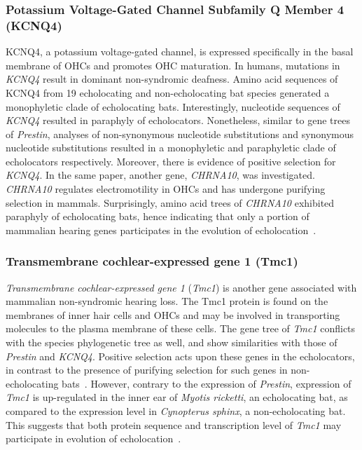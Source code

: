 \documentclass[11pt]{article}
\begin{document}
\subsubsection{Potassium Voltage-Gated Channel Subfamily Q Member 4 (KCNQ4)}

KCNQ4, a potassium voltage-gated channel, is expressed specifically in the basal membrane of OHCs and promotes OHC maturation. In humans, mutations in \textit{KCNQ4} result in dominant non-syndromic deafness. Amino acid sequences of KCNQ4 from 19 echolocating and non-echolocating bat species generated a monophyletic clade of echolocating bats. Interestingly, nucleotide sequences of \textit{KCNQ4} resulted in paraphyly of echolocators. Nonetheless, similar to gene trees of \textit{Prestin}, analyses of non-synonymous nucleotide substitutions and synonymous nucleotide substitutions resulted in a monophyletic and paraphyletic clade of echolocators respectively. Moreover, there is evidence of positive selection for \textit{KCNQ4}. In the same paper, another gene, \textit{CHRNA10}, was investigated. \textit{CHRNA10} regulates electromotility in OHCs and has undergone purifying selection in mammals. Surprisingly, amino acid trees of \textit{CHRNA10} exhibited paraphyly of echolocating bats, hence indicating that only a portion of mammalian hearing genes participates in the evolution of echolocation~\citep{Liu2012}. 
\\
\subsubsection{Transmembrane cochlear-expressed gene 1 (Tmc1)}

\textit{Transmembrane cochlear-expressed gene 1} (\textit{Tmc1}) is another gene associated with mammalian non-syndromic hearing loss. The Tmc1 protein is found on the membranes of inner hair cells and OHCs and may be involved in transporting molecules to the plasma membrane of these cells. The gene tree of \textit{Tmc1} conflicts with the species phylogenetic tree as well, and show similarities with those of \textit{Prestin} and \textit{KCNQ4}. Positive selection acts upon these genes in the echolocators, in contrast to the presence of purifying selection for such genes in non-echolocating bats~\citep{Davies2012}. However, contrary to the expression of \textit{Prestin}, expression of \textit{Tmc1} is up-regulated in the inner ear of \textit{Myotis ricketti}, an echolocating bat, as compared to the expression level in \textit{Cynopterus sphinx}, a non-echolocating bat. This suggests that both protein sequence and transcription level of \textit{Tmc1} may participate in evolution of echolocation~\citep{Eick2005}.
\\
\end{document}
